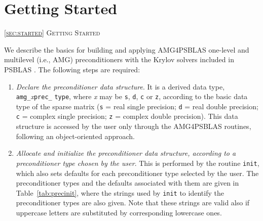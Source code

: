 \section{Getting Started\label{sec:started}}
         {\textsc{\ref{sec:started} Getting Started}}

We describe the basics for building and applying AMG4PSBLAS one-level and multilevel
(i.e., AMG) preconditioners with the Krylov solvers included in PSBLAS \cite{PSBLASGUIDE}.
The following steps are required:
\begin{enumerate}
\item \emph{Declare the preconditioner data structure}. It is a derived data type,
  \verb|amg_|\-\emph{x}\verb|prec_| \verb|type|, where \emph{x} may be \verb|s|, \verb|d|, \verb|c|
	or \verb|z|, according to the basic data type of the sparse matrix
	(\verb|s| = real single precision; \verb|d| = real double precision;
	\verb|c| = complex single precision; \verb|z| = complex double precision).
	This data structure is accessed by the user only through the AMG4PSBLAS routines,
	following an object-oriented approach.
\item \emph{Allocate and initialize the preconditioner data structure, according to
	a preconditioner type chosen by the user}. This is performed by the routine
	\verb|init|, which also sets defaults for each preconditioner
	type selected by the user. The preconditioner types and the defaults associated
	with them are given in Table~\ref{tab:precinit}, where the strings used by
	\verb|init| to identify the preconditioner types are also given.
	Note that these strings are valid also if uppercase letters are substituted by
	corresponding lowercase ones.


\end{enumerate}
